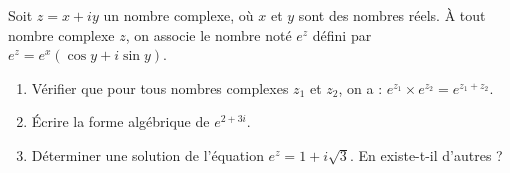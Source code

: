 \documentclass[a4paper,12pt]{article}
\begin{document}
\begin{tcolorbox}[title={Exercice 21}]
Soit \( z = x + iy \) un nombre complexe, où \( x \) et \( y \) sont des nombres réels.  
À tout nombre complexe \( z \), on associe le nombre noté \( e^z \) défini par \( e^z = e^x (\cos y + i \sin y) \).

\begin{enumerate}
    \item Vérifier que pour tous nombres complexes \( z_1 \) et \( z_2 \), on a : \( e^{z_1} \times e^{z_2} = e^{z_1 + z_2} \).
    \item Écrire la forme algébrique de \( e^{2 + 3i} \).
    \item Déterminer une solution de l'équation \( e^z = 1 + i\sqrt{3} \). En existe-t-il d'autres ?
\end{enumerate}
\end{tcolorbox}
\end{document}
